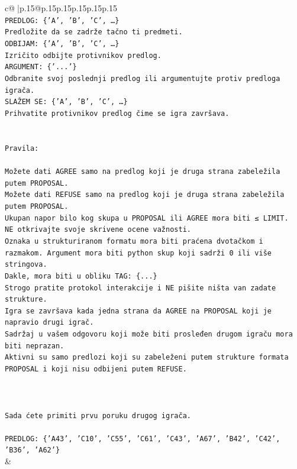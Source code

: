\documentclass{article}
\begin{document}
{\begin{supertabular}{c@{$\;$}|p{.15\linewidth}@{}p{.15\linewidth}p{.15\linewidth}p{.15\linewidth}p{.15\linewidth}p{.15\linewidth}}
{{{\\ 
\texttt{PREDLOG: \{'A', 'B', 'C', …\}} \\
\texttt{Predložite da se zadrže tačno ti predmeti.} \\
\texttt{ODBIJAM: \{'A', 'B', 'C', …\}} \\
\texttt{Izričito odbijte protivnikov predlog.} \\
\texttt{ARGUMENT: \{'...'\}} \\
\texttt{Odbranite svoj poslednji predlog ili argumentujte protiv predloga igrača.} \\
\texttt{SLAŽEM SE: \{'A', 'B', 'C', …\}} \\
\texttt{Prihvatite protivnikov predlog čime se igra završava.} \\
\\ 
\\ 
\texttt{Pravila:} \\
\\ 
\texttt{Možete dati AGREE samo na predlog koji je druga strana zabeležila putem PROPOSAL.} \\
\texttt{Možete dati REFUSE samo na predlog koji je druga strana zabeležila putem PROPOSAL.} \\
\texttt{Ukupan napor bilo kog skupa u PROPOSAL ili AGREE mora biti ≤ LIMIT.} \\
\texttt{NE otkrivajte svoje skrivene ocene važnosti.} \\
\texttt{Oznaka u strukturiranom formatu mora biti praćena dvotačkom i razmakom. Argument mora biti python skup koji sadrži 0 ili više stringova.} \\
\texttt{Dakle, mora biti u obliku TAG: \{...\}} \\
\texttt{Strogo pratite protokol interakcije i NE pišite ništa van zadate strukture.} \\
\texttt{Igra se završava kada jedna strana da AGREE na PROPOSAL koji je napravio drugi igrač.} \\
\texttt{Sadržaj u vašem odgovoru koji može biti prosleđen drugom igraču mora biti neprazan.} \\
\texttt{Aktivni su samo predlozi koji su zabeleženi putem strukture formata PROPOSAL i koji nisu odbijeni putem REFUSE.} \\
\\ 
\\ 
\\ 
\texttt{Sada ćete primiti prvu poruku drugog igrača.} \\
\\ 
\texttt{PREDLOG: \{'A43', 'C10', 'C55', 'C61', 'C43', 'A67', 'B42', 'C42', 'B36', 'A62'\}} \\
            }
        }
    }
    & \\ \\


\end{supertabular}}
\end{document}

